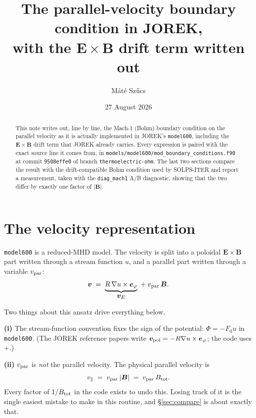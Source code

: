 \documentclass[11pt,a4paper]{article}
\title{\vspace{-1.5cm}The parallel-velocity boundary condition in JOREK,\\
       with the $\bm{E}\times\bm{B}$ drift term written out}
\author{Máté Szűcs}
\date{27 August 2026}
\newcommand{\code}[1]{\texttt{\small #1}}
\newcommand{\vE}{\bm{v}_E}
\newcommand{\eph}{\bm{e}_\varphi}
\begin{document}
\maketitle

\begin{abstract}
\noindent
This note writes out, line by line, the Mach-1 (Bohm) boundary condition on the parallel
velocity as it is actually implemented in JOREK's \code{model600}, including the
$\bm{E}\times\bm{B}$ drift term that JOREK already carries.  Every expression is paired with
the exact source line it comes from, in
\code{models/model600/mod\_boundary\_conditions.f90} at commit \code{9508effe0} of branch
\code{thermoelectric-ohm}.  The last two sections compare the result with the
drift-compatible Bohm condition used by SOLPS-ITER and report a measurement, taken with the
\code{diag\_mach1} A/B diagnostic, showing that the two differ by exactly one factor of
$|\bm{B}|$.
\end{abstract}

\section{The velocity representation}

\code{model600} is a reduced-MHD model.  The velocity is split into a poloidal
$\bm{E}\times\bm{B}$ part written through a stream function $u$, and a parallel part written
through a variable $v_{\rm par}$:
\begin{equation}
  \bm{v} \;=\; \underbrace{R\,\nabla u \times \eph}_{\textstyle \vE}
             \;+\; v_{\rm par}\,\bm{B} .
  \label{eq:ansatz}
\end{equation}

Two things about this ansatz drive everything below.

\begin{keybox}
\textbf{(i)} The stream-function convention fixes the sign of the potential:
$\Phi = -F_0 u$ in \code{model600}.  (The JOREK reference papers write
$\bm{v}_{\rm pol} = -R\nabla u\times\eph$; the code uses $+$.)

\textbf{(ii)} $v_{\rm par}$ is \emph{not} the parallel velocity.  The physical parallel
velocity is
\[
   v_\parallel \;=\; v_{\rm par}\,|\bm{B}| \;=\; v_{\rm par}\,B_{\rm tot}.
\]
Every factor of $1/B_{\rm tot}$ in the code exists to undo this.  Losing track of it is the
single easiest mistake to make in this routine, and \S\ref{sec:compare} is about exactly
that.
\end{keybox}
\end{document}
